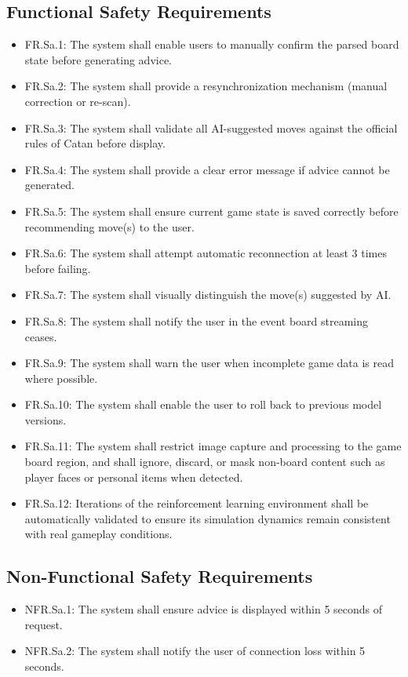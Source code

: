 \documentclass{article}
\begin{document}
\subsection*{Functional Safety Requirements}
\begin{itemize}
    \item FR.Sa.1: The system shall enable users to manually confirm the parsed board state before generating advice.
    \item FR.Sa.2: The system shall provide a resynchronization mechanism (manual correction or re-scan).
    \item FR.Sa.3: The system shall validate all AI-suggested moves against the official rules of Catan before display.
    \item FR.Sa.4: The system shall provide a clear error message if advice cannot be generated.
    \item FR.Sa.5: The system shall ensure current game state is saved correctly before recommending move(s) to the user.
    \item FR.Sa.6: The system shall attempt automatic reconnection at least 3 times before failing.
    \item FR.Sa.7: The system shall visually distinguish the move(s) suggested by AI.
    \item FR.Sa.8: The system shall notify the user in the event board streaming ceases.
    \item FR.Sa.9: The system shall warn the user when incomplete game data is read where possible.
    \item FR.Sa.10: The system shall enable the user to roll back to previous model versions.
    \item FR.Sa.11: The system shall restrict image capture and processing to the game board region, and shall ignore, discard, or mask non-board content such as player faces or personal items when detected.
    \item FR.Sa.12: Iterations of the reinforcement learning environment shall be automatically validated to ensure its simulation dynamics remain consistent with real gameplay conditions. \newline
\end{itemize}

\subsection*{Non-Functional Safety Requirements}
\begin{itemize}
    \item NFR.Sa.1: The system shall ensure advice is displayed within 5 seconds of request.
    \item NFR.Sa.2: The system shall notify the user of connection loss within 5 seconds.
\end{itemize}
\end{document}
